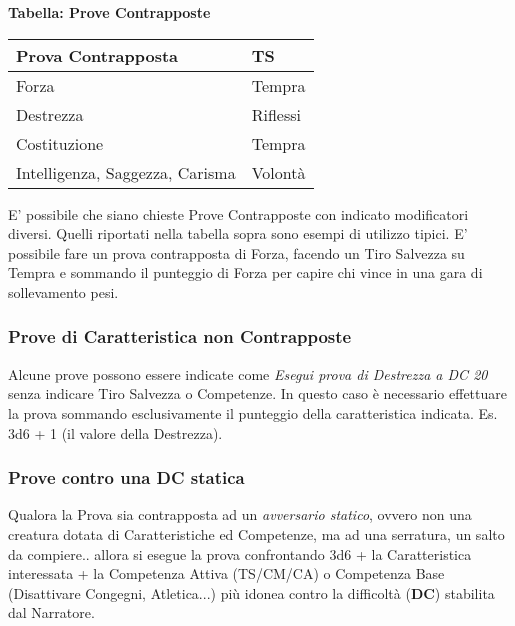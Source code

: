 \begin{multicols}{2}
\smallskip

\textbf{Tabella: Prove Contrapposte}\label{Tabella Prove Contrapposte e Caratteristiche}

\smallskip

\noindent\begin{tabularx}{\linewidth}{Xl}
\toprule
\rowcolor{gray!20}\textbf{Prova Contrapposta}& \textbf{TS} \\
\toprule
Forza& Tempra \\
\rowcolor{gray!20}Destrezza&Riflessi\\
Costituzione& Tempra\\
\rowcolor{gray!20}Intelligenza, Saggezza, Carisma& Volontà
\end{tabularx}

\smallskip

E' possibile che siano chieste Prove Contrapposte con indicato modificatori diversi. Quelli riportati nella tabella sopra sono esempi di utilizzo tipici. E' possibile fare un prova contrapposta di Forza, facendo un Tiro Salvezza su Tempra e sommando il punteggio di Forza per capire chi vince in una gara di sollevamento pesi.

\subsubsection{Prove di Caratteristica non Contrapposte}

Alcune prove possono essere indicate come \emph{Esegui prova di Destrezza a DC 20} senza indicare Tiro Salvezza o Competenze. In questo caso è necessario effettuare la prova sommando esclusivamente il punteggio della caratteristica indicata. Es. 3d6 + 1 (il valore della Destrezza).

\subsubsection{Prove contro una DC statica}

Qualora la Prova sia contrapposta ad un \textit{avversario statico}, ovvero non una creatura dotata di Caratteristiche ed Competenze, ma ad una serratura, un salto da compiere.. allora si esegue la prova confrontando 3d6 + la Caratteristica interessata + la Competenza Attiva (TS/CM/CA) o Competenza Base (Disattivare Congegni, Atletica...) più idonea contro la difficoltà (\textbf{DC}) stabilita dal Narratore.


\end{multicols}
